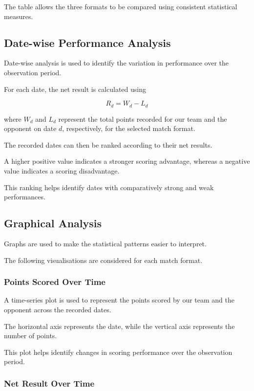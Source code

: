 The table allows the three formats to be compared
using consistent statistical measures.

\subsection{Date-wise Performance Analysis}

Date-wise analysis is used to identify the variation
in performance over the observation period.

For each date, the net result is calculated using

\[
R_d = W_d - L_d
\]

where $W_d$ and $L_d$ represent the total points
recorded for our team and the opponent on date $d$,
respectively, for the selected match format.

The recorded dates can then be ranked according to
their net results.

A higher positive value indicates a stronger
scoring advantage, whereas a negative value indicates
a scoring disadvantage.

This ranking helps identify dates with comparatively
strong and weak performances.

\subsection{Graphical Analysis}

Graphs are used to make the statistical patterns
easier to interpret.

The following visualisations are considered for
each match format.

\subsubsection{Points Scored Over Time}

A time-series plot is used to represent the points
scored by our team and the opponent across the
recorded dates.

The horizontal axis represents the date, while the
vertical axis represents the number of points.

This plot helps identify changes in scoring
performance over the observation period.

\subsubsection{Net Result Over Time}

